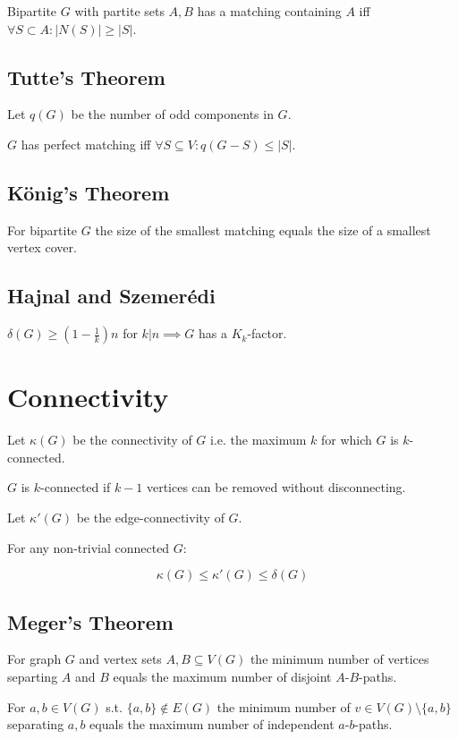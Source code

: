 Bipartite $G$ with partite sets $A, B$ has a matching containing $A$ iff $\forall S \subset A : |N(S)|\geq|S|$.

\subsection*{Tutte's Theorem}

Let $q(G)$ be the number of odd components in $G$.

$G$ has perfect matching iff $\forall S \subseteq V : q(G-S) \leq |S|$.

\subsection*{König's Theorem}

For bipartite $G$ the size of the smallest matching equals the size of a smallest vertex cover.

\subsection*{Hajnal and Szemer\'{e}di}

$\delta(G) \geq (1-\frac{1}{k})n$ for $k | n \implies G$ has a $K_k$-factor.

\section*{Connectivity}

Let $\kappa(G)$ be the connectivity of $G$ i.e. the maximum $k$ for which $G$ is $k$-connected.

$G$ is $k$-connected if $k-1$ vertices can be removed without disconnecting.

Let $\kappa'(G)$ be the edge-connectivity of $G$.

For any non-trivial connected $G$:

$$\kappa(G) \leq \kappa'(G) \leq \delta(G)$$

\subsection*{Meger's Theorem}

For graph $G$ and vertex sets $A,B \subseteq V(G)$ the minimum number of vertices separting $A$ and $B$ equals the maximum number of disjoint $A$-$B$-paths.

\spacing

For $a, b \in V(G)$ s.t. $\{a,b\} \notin E(G)$ the minimum number of $v \in V(G)\setminus\{a,b\}$ separating $a, b$ equals the maximum number of independent $a$-$b$-paths.

